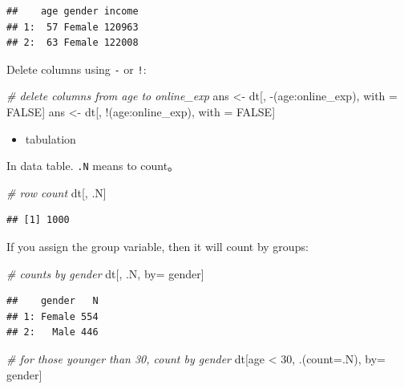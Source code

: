 \documentclass[12pt,]{krantz}
\newenvironment{Shaded}{\begin{snugshade}}{\end{snugshade}}
\newcommand{\DataTypeTok}[1]{\textcolor[rgb]{0.13,0.29,0.53}{{#1}}}
\newcommand{\DecValTok}[1]{\textcolor[rgb]{0.00,0.00,0.81}{{#1}}}
\newcommand{\StringTok}[1]{\textcolor[rgb]{0.31,0.60,0.02}{{#1}}}
\newcommand{\CommentTok}[1]{\textcolor[rgb]{0.56,0.35,0.01}{\textit{{#1}}}}
\newcommand{\OtherTok}[1]{\textcolor[rgb]{0.56,0.35,0.01}{{#1}}}
\newcommand{\NormalTok}[1]{{#1}}
\providecommand{\tightlist}{%
  \setlength{\itemsep}{0pt}\setlength{\parskip}{0pt}}
\theoremstyle{definition}
\theoremstyle{definition}
\theoremstyle{remark}
\begin{document}
\begin{verbatim}
##    age gender income
## 1:  57 Female 120963
## 2:  63 Female 122008
\end{verbatim}

Delete columns using \texttt{-} or \texttt{!}:

\begin{Shaded}
\begin{Highlighting}[]
\CommentTok{# delete columns from  age to online_exp}
\NormalTok{ans <-}\StringTok{ }\NormalTok{dt[, -(age:online_exp), with =}\StringTok{ }\OtherTok{FALSE}\NormalTok{]}
\NormalTok{ans <-}\StringTok{ }\NormalTok{dt[, !(age:online_exp), with =}\StringTok{ }\OtherTok{FALSE}\NormalTok{]}
\end{Highlighting}
\end{Shaded}

\begin{itemize}
\tightlist
\item
  tabulation
\end{itemize}

In data table. \texttt{.N} means to count。

\begin{Shaded}
\begin{Highlighting}[]
\CommentTok{# row count}
\NormalTok{dt[, .N] }
\end{Highlighting}
\end{Shaded}

\begin{verbatim}
## [1] 1000
\end{verbatim}

If you assign the group variable, then it will count by groups:

\begin{Shaded}
\begin{Highlighting}[]
\CommentTok{# counts by gender}
\NormalTok{dt[, .N, by=}\StringTok{ }\NormalTok{gender]  }
\end{Highlighting}
\end{Shaded}

\begin{verbatim}
##    gender   N
## 1: Female 554
## 2:   Male 446
\end{verbatim}

\begin{Shaded}
\begin{Highlighting}[]
\CommentTok{# for those younger than 30, count by gender}
 \NormalTok{dt[age <}\StringTok{ }\DecValTok{30}\NormalTok{, .(}\DataTypeTok{count=}\NormalTok{.N), by=}\StringTok{ }\NormalTok{gender] }
\end{Highlighting}
\end{Shaded}
\end{document}
